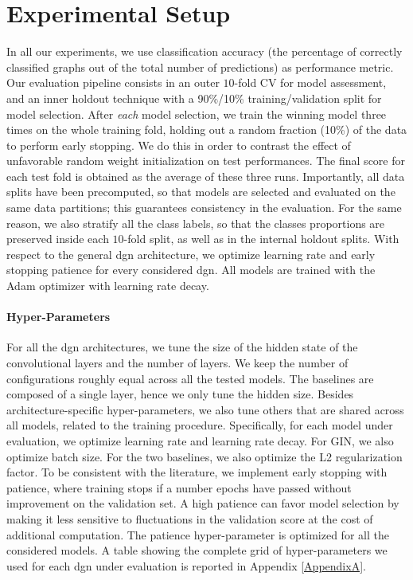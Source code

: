 \section{Experimental Setup}\label{sec:comparison-exp-setup}
In all our experiments, we use classification accuracy (\ie the percentage of correctly classified graphs out of the total number of predictions) as performance metric.
Our evaluation pipeline consists in an outer $10$-fold CV for model assessment, and an inner holdout technique with a 90\%/10\% training/validation split for model selection. After \emph{each} model selection, we train the winning model three times on the whole training fold, holding out a random fraction (10\%) of the data to perform early stopping. We do this in order to contrast the effect of unfavorable random weight initialization on test performances. The final score for each test fold is obtained as the average of these three runs. Importantly, all data splits have been precomputed, so that models are selected and evaluated on the same data partitions; this guarantees consistency in the evaluation. For the same reason, we also stratify all the class labels, so that the classes proportions are preserved inside each $10$-fold split, as well as in the internal holdout splits. With respect to the general \gls{dgn} architecture, we optimize learning rate and early stopping patience for every considered \gls{dgn}. All models are trained with the Adam \citep{kingma2015adam} optimizer with learning rate decay.

\paragraph{Hyper-Parameters}
For all the \gls{dgn} architectures, we tune the size of the hidden state of the convolutional layers and the number of layers. We keep the number of configurations roughly equal across all the tested models. The baselines are composed of a single layer, hence we only tune the hidden size. Besides architecture-specific hyper-parameters, we also tune others that are shared across all models, related to the training procedure. Specifically, for each model under evaluation, we optimize learning rate and learning rate decay. For GIN, we also optimize batch size. For the two baselines, we also optimize the L2 regularization factor. To be consistent with the literature, we implement early stopping with patience, where training stops if a number epochs have passed without improvement on the validation set. A high patience can favor model selection by making it less sensitive to fluctuations in the validation score at the cost of additional computation. The patience hyper-parameter is optimized for all the considered models. A table showing the complete grid of hyper-parameters we used for each \gls{dgn} under evaluation is reported in Appendix \ref{AppendixA}.

